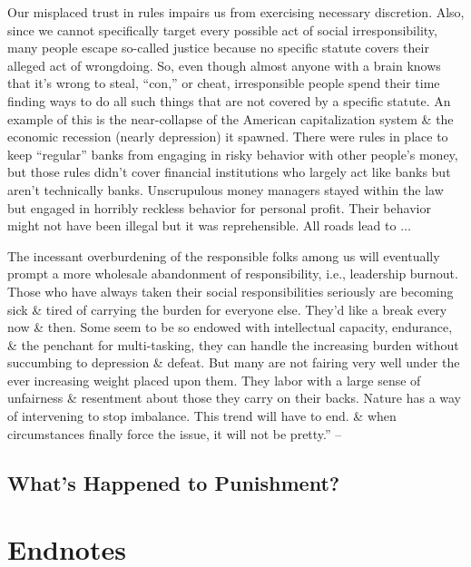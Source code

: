 \documentclass{article}
\numberwithin{equation}{section}
\begin{document}
Our misplaced trust in rules impairs us from exercising necessary discretion. Also, since we cannot specifically target every possible act of social irresponsibility, many people escape so-called justice because no specific statute covers their alleged act of wrongdoing. So, even though almost anyone with a brain knows that it's wrong to steal, ``con,'' or cheat, irresponsible people spend their time finding ways to do all such things that are not covered by a specific statute. An example of this is the near-collapse of the American capitalization system \& the economic recession (nearly depression) it spawned. There were rules in place to keep ``regular'' banks from engaging in risky behavior with other people's money, but those rules didn't cover financial institutions who largely act like banks but aren't technically banks. Unscrupulous money managers stayed within the law but engaged in horribly reckless behavior for personal profit. Their behavior might not have been illegal but it was reprehensible. All roads lead to $\ldots$

The incessant overburdening of the responsible folks among us will eventually prompt a more wholesale abandonment of responsibility, i.e., leadership burnout. Those who have always taken their social responsibilities seriously are becoming sick \& tired of carrying the burden for everyone else. They'd like a break every now \& then. Some seem to be so endowed with intellectual capacity, endurance, \& the penchant for multi-tasking, they can handle the increasing burden without succumbing to depression \& defeat. But many are not fairing very well under the ever increasing weight placed upon them. They labor with a large sense of unfairness \& resentment about those they carry on their backs. Nature has a way of intervening to stop imbalance. This trend will have to end. \& when circumstances finally force the issue, it will not be pretty.'' -- \cite[pp. 235--237]{Simon2011}

\subsection{What's Happened to Punishment?}


\section*{Endnotes}


\printbibliography[heading=bibintoc]
	
\end{document}
